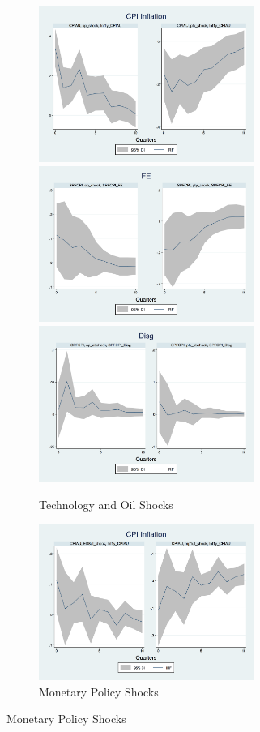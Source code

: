 \documentclass[12pt]{article}
\begin{document}
\begin{figure}[ht]
	\begin{subfigure}[b]{0.5\textwidth}
		\centering
		\caption{Technology and Oil Shocks}
		\includegraphics[width=7cm]{figures/CPIAU_ashocks_nmp_before2007.png}  
		\smallskip
		\includegraphics[width=7cm]{figures/SPFFE_ashocks_nmp_before2007.png} 
		\smallskip
		\includegraphics[width=7cm]{figures/SPFDisg_ab_ashocks_nmp_before2007.png} 
	\end{subfigure}
	\hspace{1em}
	\hfill
	\begin{subfigure}[b]{0.5\textwidth}
		\caption{Monetary Policy Shocks}
		\includegraphics[width=7cm]{figures/CPIAU_ashocks_before2007.png} 

\end{subfigure}
\end{figure}
\end{document}
